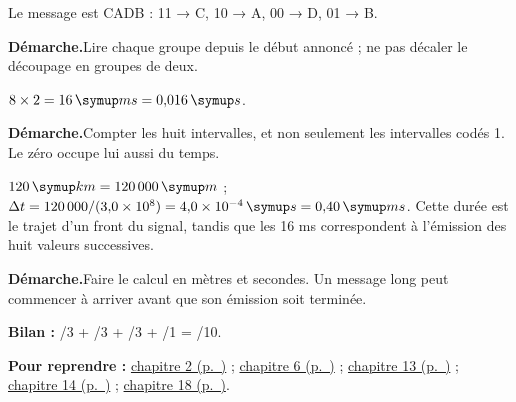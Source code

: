 \par\noindent\begin{minipage}{\linewidth}Le message est CADB : 11 → C, 10 → A, 00 → D, 01 → B.\par\smallskip\textbf{Démarche.}\enspace Lire chaque groupe depuis le début annoncé ; ne pas décaler le découpage en groupes de deux.\par{}\end{minipage}\par
\par\noindent\begin{minipage}{\linewidth}$8\times2=16\unite{ms}=0{,}016\unite s$.\par\smallskip\textbf{Démarche.}\enspace Compter les huit intervalles, et non seulement les intervalles codés 1. Le zéro occupe lui aussi du temps.\par{}\end{minipage}\par
\par\noindent\begin{minipage}{\linewidth}$120\unite{km}=120\,000\unite m$ ; $\Delta t=120\,000/(3{,}0\times10^8)=4{,}0\times10^{-4}\unite s=0{,}40\unite{ms}$. Cette durée est le trajet d’un front du signal, tandis que les 16 ms correspondent à l’émission des huit valeurs successives.\par\smallskip\textbf{Démarche.}\enspace Faire le calcul en mètres et secondes. Un message long peut commencer à arriver avant que son émission soit terminée.\par{}\end{minipage}\par
{}
\par\noindent\begin{minipage}{\linewidth}{\small\textbf{Bilan :} /3 + /3 + /3 + /1 = /10.\par\textbf{Pour reprendre :} \hyperref[chap-2]{chapitre 2 (p.~\pageref*{chap-2})} ; \hyperref[chap-6]{chapitre 6 (p.~\pageref*{chap-6})} ; \hyperref[chap-13]{chapitre 13 (p.~\pageref*{chap-13})} ; \hyperref[chap-14]{chapitre 14 (p.~\pageref*{chap-14})} ; \hyperref[chap-18]{chapitre 18 (p.~\pageref*{chap-18})}.\par}\end{minipage}\par
